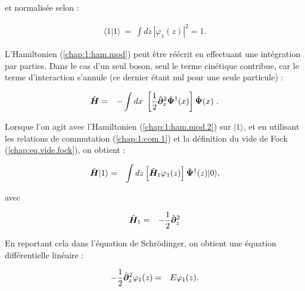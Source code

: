 et normalisée selon :

\begin{eqnarray}
	\langle 1 \vert 1 \rangle ~=~ \int dz\,  |\varphi_1(z)|^2 = 1.
\end{eqnarray}

L'Hamiltonien (\ref{chap:1:ham.mod}) peut être réécrit en effectuant une intégration par parties. Dans le cas d'un seul boson, seul le terme cinétique contribue, car le terme d'interaction s'annule (ce dernier étant nul pour une seule particule) :


\begin{eqnarray}
	\operator{H} & = & -\int dx  \left [\frac{1}{2}\operator{\partial}_x^2 \operator{\Psi}^\dag(x)\right ] \operator{\Psi}(x)  \label{chap:1:ham.mod.2}.
\end{eqnarray}

Lorsque l’on agit avec l’Hamiltonien (\ref{chap:1:ham.mod.2}) sur \(\vert 1 \rangle\), et en utilisant les relations de commutation (\ref{chap:1:com.1}) et la définition du vide de Fock (\ref{chap:eq.vide.fock}), on obtient : 

\begin{eqnarray}
	\hat{\bm{H}}\vert 1 \rangle & = & \int dz \left [\hat{\bm{H}}_1  \varphi_{1}(z)  \right ] \hat{\bm{\Psi}}^\dag (z)	 \vert 0 \rangle,	
\end{eqnarray}

avec 

\begin{eqnarray*}
		\hat{\bm{H}}_1 & = & - \frac{1}{2} \hat{\bm{\partial}}_z^2
\end{eqnarray*}

En reportant cela dans l’équation de Schrödinger, on obtient une équation différentielle linéaire :

\begin{eqnarray}
	- \frac{1}{2} \hat{\bm{\partial}}_z^2 \varphi_1(z) & = & E \varphi_1(z). \label{chap:eq.onebody.schrod}
\end{eqnarray}





